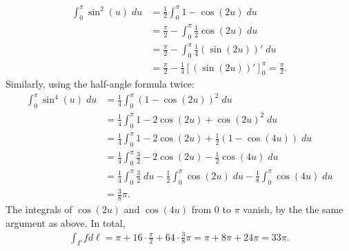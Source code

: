 \documentclass[11pt]{article}
\begin{document}
\begin{solution}
\begin{align*}
        \int_0^{\pi} \sin^2(u) \;du
        &=
        \frac 1 2 \int_0^{\pi} 1 - \cos(2u) \;du
        \\&=
        \frac \pi 2 - \int_0^{\pi} \frac 1 2 \cos(2u) \;du
        \\&=
        \frac \pi 2 - \int_0^{\pi} \frac 1 4 (\sin(2u))' \;du
        \\&=
        \frac \pi 2 - \frac 1 4 \left[ (\sin(2u))' \right]_0^\pi
        =
        \frac \pi 2
        .
    \end{align*}
    Similarly, using the half-angle formula twice: 
    \begin{align*}
        \int_0^{\pi} \sin^4(u) \;du
        &=
        \frac 1 4 \int_0^{\pi} \left( 1 - \cos(2u) \right)^2 \;du
        \\&=
        \frac 1 4 \int_0^{\pi} 1 - 2 \cos(2u) + \cos(2u)^2 \;du
        \\&=
        \frac 1 4 \int_0^{\pi} 1 - 2 \cos(2u) + \frac 1 2 \left( 1 - \cos(4u) \right) \;du
        \\&=
        \frac 1 4 \int_0^{\pi} \frac 3 2 - 2 \cos(2u) - \frac 1 2 \cos(4u) \;du
        \\&=
        \frac 1 4 \int_0^{\pi} \frac 3 2 \;du - \frac 1 2 \int_0^{\pi} \cos(2u) \;du - \frac 1 8 \int_0^{\pi} \cos(4u) \;du
        \\&=
        \frac 3 8 \pi
        .
    \end{align*}
    The integrals of $\cos(2u)$ and $\cos(4u)$ from $0$ to $\pi$ vanish, by the the same argument as above. 
    In total,
    \begin{align*}
        \int_\Gamma f d\ell
        =
        \pi + 16 \cdot \frac \pi 2 + 64 \cdot \frac 3 8 \pi
        =
        \pi + 8\pi + 24 \pi
        =
        33 \pi
        .
    \end{align*}
\end{solution}
\end{document}
